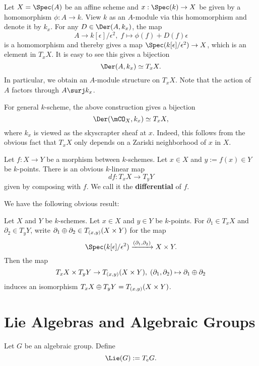 \begin{constr}
	Let $X=\Spec(A)$ be an affine scheme and $x:\Spec(k) \to X$ be given by a homomorphism $\phi:A\to k$. View $k$ as an $A$-module via this homomorphism and denote it by $k_x$. For any $D\in \Der(A,k_x)$, the map 
	\[
		A\to k[\epsilon]/\epsilon^2,\; f\mapsto \phi(f)+D(f)\epsilon
	\]
	is a homomorphism and thereby gives a map $\Spec(k[\epsilon]/\epsilon^2) \to X$, which is an element in $T_x X$. It is easy to see this gives a bijection
	\[
		\Der(A,k_x) \simeq T_x X.
	\]
	In particular, we obtain an $A$-module structure on $T_x X$. Note that the action of $A$ factors through $A\surj k_x$.

	For general $k$-scheme, the above construction gives a bijection
	\[
		\Der(\mCO_X,k_x) \simeq T_x X,
	\]
	where $k_x$ is viewed as the skyscrapter sheaf at $x$. Indeed, this follows from the obvious fact that $T_xX$ only depends on a Zariski neighborhood of $x$ in $X$.
\end{constr}

\begin{constr}
	Let $f:X\to Y$ be a morphism between $k$-schemes. Let $x\in X$ and $y:=f(x)\in Y$ be $k$-points. There is an obvious $k$-linear map
	\[
		df: T_x X \to T_y Y
	\]
	given by composing with $f$. We call it the \textbf{differential} of $f$.
\end{constr}

	We have the following obvious result:

\begin{lem}
	\label{lem-tangent-product}
 	Let $X$ and $Y$ be $k$-schemes. Let $x\in X$ and $y\in Y$ be $k$-points. For $\partial_1\in T_x X$ and $\partial_2\in T_yY$, write $\partial_1\oplus\partial_2\in T_{(x,y)}(X\mt Y)$ for the map
 	\[
 		\Spec(k[\epsilon]/\epsilon^2) \xrightarrow{(\partial_1,\partial_2)} X\mt  Y.
 	\]
 	Then the map
 	\begin{equation}
 		\label{eqn-sum-tangent}
 		T_x X \times T_y Y \to T_{(x,y)}(X\mt Y),\; (\partial_1,\partial_2) \mapsto \partial_1\oplus\partial_2
 	\end{equation}
 	induces an isomorphism $T_x X\oplus T_y Y = T_{(x,y)}(X\mt Y)$.

\end{lem}


\section{Lie Algebras and Algebraic Groups}

\begin{notn}
	Let $G$ be an algebraic group. Define
	\[
		\Lie(G):= T_e G.
	\]
\end{notn}

